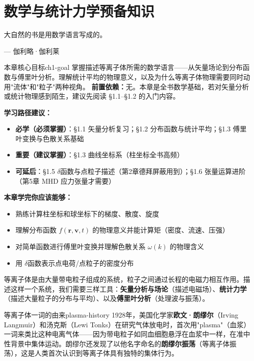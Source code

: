 \documentclass[12pt,a4paper,openany,oneside]{book}
\newcommand{\vect}[1]{\bm{#1}}
\begin{document}
\newpage


\chapter{数学与统计力学预备知识}\label{ch:1}
\epigraph{大自然的书是用数学语言写成的。}{--- 伽利略·伽利莱}

\begin{insight}{本章核心目标}{ch1-goal}
掌握描述等离子体所需的数学语言——从矢量场论到分布函数与傅里叶分析。理解统计平均的物理意义，以及为什么等离子体物理需要同时动用"流体"和"粒子"两种视角。
\tcblower
\textbf{前置依赖：}无。本章是全书数学基础，若对矢量分析或统计物理感到陌生，建议先阅读 \S1.1--\S1.2 的入门内容。

\textbf{学习路径建议：}

\begin{itemize}[leftmargin=*]
\item[\textcolor{red}{$\blacksquare$}] \textbf{必学（必须掌握）}：\S1.1 矢量分析复习；\S1.2 分布函数与统计平均；\S1.3 傅里叶变换与色散关系基础
\item[\textcolor{orange}{$\blacksquare$}] \textbf{重要（建议掌握）}：\S1.3 曲线坐标系（柱坐标全书高频）
\item[\textcolor{green}{$\blacksquare$}] \textbf{可延后}：\S1.5 $\delta$函数与点粒子描述（第2章德拜屏蔽用到）；\S1.6 张量运算进阶（第5章 MHD 应力张量才需要）
\end{itemize}

\textbf{本章学完你应该能够：}
\begin{itemize}[label=$\square$]
\item 熟练计算柱坐标和球坐标下的梯度、散度、旋度
\item 理解分布函数 $f(\vect{r},\vect{v},t)$ 的物理意义并能计算矩（密度、流速、压强）
\item 对简单函数进行傅里叶变换并理解色散关系 $\omega(k)$ 的物理含义
\item 用 $\delta$函数表示点电荷/点粒子的密度分布
\end{itemize}
\end{insight}

等离子体是由大量带电粒子组成的系统，粒子之间通过长程的电磁力相互作用。描述这样一个系统，我们需要三样工具：\textbf{矢量分析与场论}（描述电磁场）、\textbf{统计力学}（描述大量粒子的分布与平均）、以及\textbf{傅里叶分析}（处理波与振荡）。

\begin{history}{等离子体一词的由来}{plasma-history}
1928年，美国化学家\textbf{欧文·朗缪尔}（Irving Langmuir）和汤克斯（Lewi Tonks）在研究气体放电时，首次用"plasma"（血浆）一词来类比这种电离气体——因为带电粒子如同血细胞悬浮在血浆中一样，在准中性背景中集体运动。朗缪尔还发现了以他名字命名的\textbf{朗缪尔振荡}（等离子体振荡），这是人类首次认识到等离子体具有独特的集体行为。
\end{history}
\end{document}
